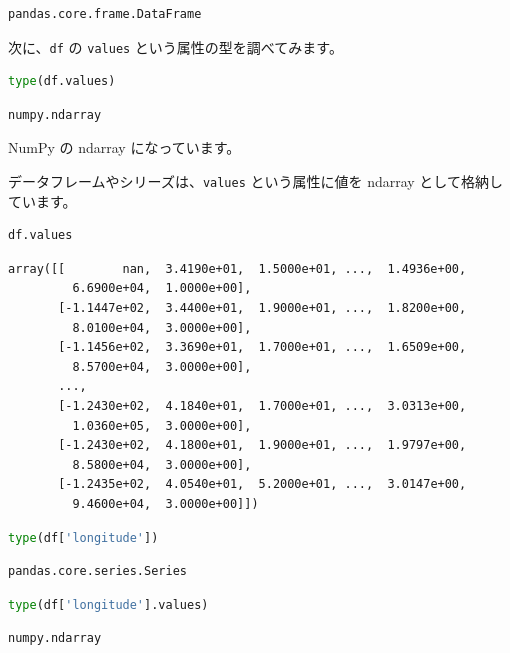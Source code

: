 \begin{lstlisting}[style=outputcell]
pandas.core.frame.DataFrame
\end{lstlisting}

次に、\texttt{df} の \texttt{values} という属性の型を調べてみます。


\begin{lstlisting}[style=codecell,language=Python]
type(df.values)
\end{lstlisting}

\begin{lstlisting}[style=outputcell]
numpy.ndarray
\end{lstlisting}

NumPy の ndarray になっています。

データフレームやシリーズは、\texttt{values} という属性に値を ndarray として格納しています。


\begin{lstlisting}[style=codecell,language=Python]
df.values
\end{lstlisting}

\begin{lstlisting}[style=outputcell]
array([[        nan,  3.4190e+01,  1.5000e+01, ...,  1.4936e+00,
         6.6900e+04,  1.0000e+00],
       [-1.1447e+02,  3.4400e+01,  1.9000e+01, ...,  1.8200e+00,
         8.0100e+04,  3.0000e+00],
       [-1.1456e+02,  3.3690e+01,  1.7000e+01, ...,  1.6509e+00,
         8.5700e+04,  3.0000e+00],
       ...,
       [-1.2430e+02,  4.1840e+01,  1.7000e+01, ...,  3.0313e+00,
         1.0360e+05,  3.0000e+00],
       [-1.2430e+02,  4.1800e+01,  1.9000e+01, ...,  1.9797e+00,
         8.5800e+04,  3.0000e+00],
       [-1.2435e+02,  4.0540e+01,  5.2000e+01, ...,  3.0147e+00,
         9.4600e+04,  3.0000e+00]])
\end{lstlisting}

\begin{lstlisting}[style=codecell,language=Python]
type(df['longitude'])
\end{lstlisting}

\begin{lstlisting}[style=outputcell]
pandas.core.series.Series
\end{lstlisting}

\begin{lstlisting}[style=codecell,language=Python]
type(df['longitude'].values)
\end{lstlisting}

\begin{lstlisting}[style=outputcell]
numpy.ndarray
\end{lstlisting}

